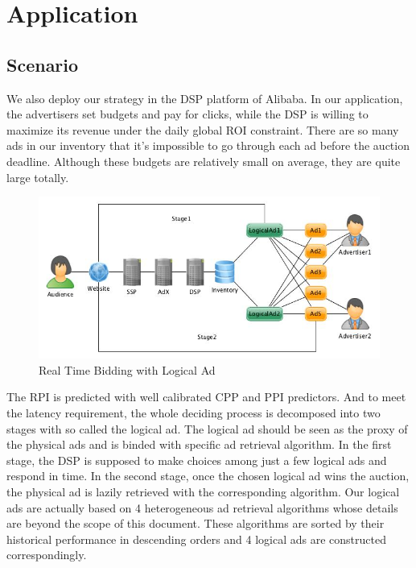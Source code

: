 \documentclass{article}
\begin{document}
\section{Application} \label{Application}

\subsection{Scenario}

We also deploy our strategy in the DSP platform of Alibaba.
In our application, the advertisers set budgets and pay for clicks, while the DSP is willing to maximize its revenue under the daily global ROI constraint.
There are so many ads in our inventory that it's impossible to go through each ad before the auction deadline.
Although these budgets are relatively small on average, they are quite large totally.

\begin{figure}[!h]
\centering
\includegraphics[width=1.0\linewidth]{./LogicalAd.jpg}
\caption{Real Time Bidding with Logical Ad}
\end{figure}

The RPI is predicted with well calibrated CPP and PPI predictors.
And to meet the latency requirement, the whole deciding process is decomposed into two stages with so called the logical ad.
The logical ad should be seen as the proxy of the physical ads and is binded with specific ad retrieval algorithm.
In the first stage, the DSP is supposed to make choices among just a few logical ads and respond in time.
In the second stage, once the chosen logical ad wins the auction, the physical ad is lazily retrieved with the corresponding algorithm.
Our logical ads are actually based on 4 heterogeneous ad retrieval algorithms whose details are beyond the scope of this document.
These algorithms are sorted by their historical performance in descending orders and 4 logical ads are constructed correspondingly.
\end{document}

